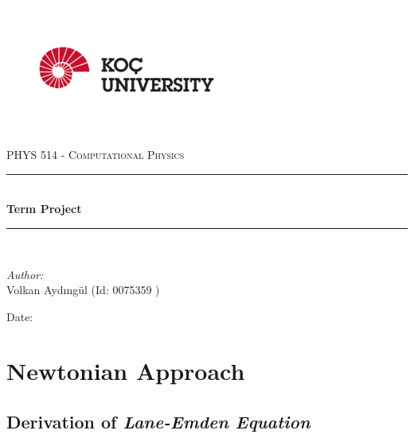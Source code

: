 \documentclass[letterpaper,12pt]{article}
\newcommand{\reporttitle}{Term Project}
\newcommand{\reportauthor}{ Volkan Aydıngül (Id: 0075359 )\\
                            }
\begin{document}
\begin{titlepage}
\newcommand{\HRule}{\rule{0.7\linewidth}{0.5mm}}
\begin{center} %
\includegraphics[width = 8cm]{figures/koc_logo.png}

\textsc{\Large PHYS 514 - Computational Physics}\\[1.5cm] 
\HRule \\[0.6cm]
{ \huge \bfseries \reporttitle}\\ %
\HRule \\[1.5cm]
\end{center}
\vspace{2cm}
\begin{flushleft} \large
\textit{Author:}\\
\reportauthor%
\end{flushleft}
\vspace{2cm}
\makeatletter
Date: \@date 
\vfill %
\makeatother
\end{titlepage}




\tableofcontents
\newpage






\section{Newtonian Approach}

\subsection{Derivation of \textit{Lane-Emden Equation}}
\end{document}
